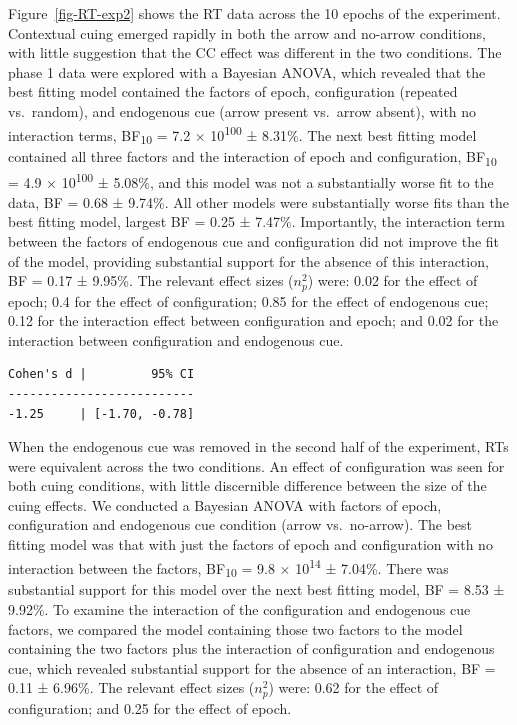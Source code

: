\documentclass[
  man,
  floatsintext,
  longtable,
  nolmodern,
  notxfonts,
  notimes,
  colorlinks=true,linkcolor=blue,citecolor=blue,urlcolor=blue]{apa7}
\begin{document}
Figure~\ref{fig-RT-exp2} shows the RT data across the 10 epochs of the
experiment. Contextual cuing emerged rapidly in both the arrow and
no-arrow conditions, with little suggestion that the CC effect was
different in the two conditions. The phase 1 data were explored with a
Bayesian ANOVA, which revealed that the best fitting model contained the
factors of epoch, configuration (repeated vs.~random), and endogenous
cue (arrow present vs.~arrow absent), with no interaction terms,
BF\textsubscript{10} = 7.2 × 10\textsuperscript{100} ± 8.31\%. The next
best fitting model contained all three factors and the interaction of
epoch and configuration, BF\textsubscript{10} = 4.9 ×
10\textsuperscript{100} ± 5.08\%, and this model was not a substantially
worse fit to the data, BF = 0.68 ± 9.74\%. All other models were
substantially worse fits than the best fitting model, largest BF = 0.25
± 7.47\%. Importantly, the interaction term between the factors of
endogenous cue and configuration did not improve the fit of the model,
providing substantial support for the absence of this interaction, BF =
0.17 ± 9.95\%. The relevant effect sizes (\(n^2_p\)) were: 0.02 for the
effect of epoch; 0.4 for the effect of configuration; 0.85 for the
effect of endogenous cue; 0.12 for the interaction effect between
configuration and epoch; and 0.02 for the interaction between
configuration and endogenous cue.

\begin{verbatim}
Cohen's d |         95% CI
--------------------------
-1.25     | [-1.70, -0.78]
\end{verbatim}

When the endogenous cue was removed in the second half of the
experiment, RTs were equivalent across the two conditions. An effect of
configuration was seen for both cuing conditions, with little
discernible difference between the size of the cuing effects. We
conducted a Bayesian ANOVA with factors of epoch, configuration and
endogenous cue condition (arrow vs.~no-arrow). The best fitting model
was that with just the factors of epoch and configuration with no
interaction between the factors, BF\textsubscript{10} = 9.8 ×
10\textsuperscript{14} ± 7.04\%. There was substantial support for this
model over the next best fitting model, BF = 8.53 ± 9.92\%. To examine
the interaction of the configuration and endogenous cue factors, we
compared the model containing those two factors to the model containing
the two factors plus the interaction of configuration and endogenous
cue, which revealed substantial support for the absence of an
interaction, BF = 0.11 ± 6.96\%. The relevant effect sizes (\(n^2_p\))
were: 0.62 for the effect of configuration; and 0.25 for the effect of
epoch.
\end{document}
